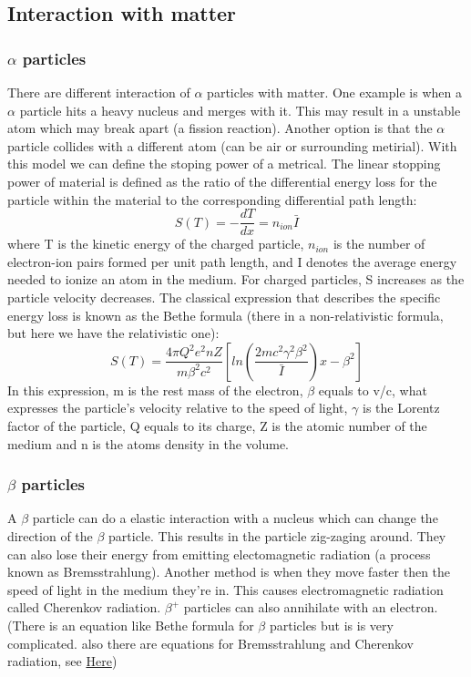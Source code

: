 \documentclass[]{article}
\begin{document}
\subsection{Interaction with matter}
\subsubsection{$\alpha$ particles}

There are different interaction of $\alpha$ particles with matter. One example is when a $\alpha$ particle hits a heavy nucleus and merges with it. This may result in a unstable atom which may break apart (a fission reaction).
Another option is that the $\alpha$ particle collides with a different atom (can be air or surrounding metirial). With this model we can define the stoping power of a metrical.  The linear stopping power of material is defined as the ratio of the differential energy loss for the particle within the material to the corresponding differential path length: $$S(T)=-\frac{dT}{dx}=n_{ion}\bar{I}$$ where T is the kinetic energy of the charged particle, $n_{ion}$ is the number of electron-ion pairs formed per unit path length, and I denotes the average energy needed to ionize an atom in the medium. For charged particles, S increases as the particle velocity decreases. The classical expression that describes the specific energy loss is known as the Bethe formula (there in a non-relativistic formula, but here we have the relativistic one): $$S(T)=\frac{4\pi Q^2e^2nZ}{m\beta^2c^2}\left[ln\left(\frac{2mc^2\gamma^2\beta^2}{\bar{I}}\right)x-\beta^2\right]$$ In this expression, m is the rest mass of the electron, $\beta$ equals to v/c, what expresses the particle’s velocity relative to the speed of light, $\gamma$ is the Lorentz factor of the particle, Q equals to its charge, Z is the atomic number of the medium and n is the atoms density in the volume. 

\subsubsection{$\beta$ particles}

A $\beta$ particle can do a elastic interaction with a nucleus which can change the direction of the $\beta$ particle. This results in the particle zig-zaging around. They can also lose their energy from emitting electomagnetic radiation (a process known as Bremsstrahlung). Another method is when they move faster then the speed of light in the medium they're in. This causes electromagnetic radiation called Cherenkov radiation. $\beta^+$ particles can also annihilate with an electron.(There is an equation like Bethe formula for $\beta$ particles but is is very complicated. also there are equations for Bremsstrahlung and Cherenkov radiation, see \href{http://www.nuclear-power.net/nuclear-power/reactor-physics/interaction-radiation-matter/interaction-beta-radiation/}{Here})
\end{document}
